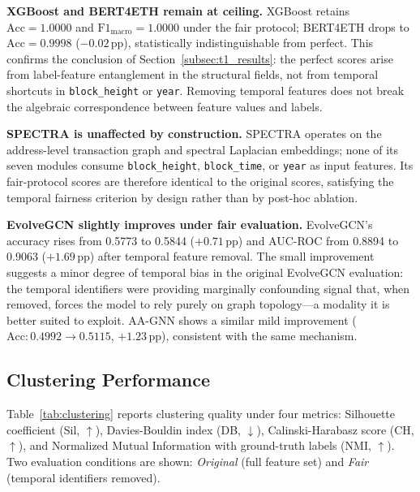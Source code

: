 \documentclass[journal]{IEEEtran}
\begin{document}
\textbf{XGBoost and BERT4ETH remain at ceiling.}
XGBoost retains $\text{Acc} = \num{1.0000}$ and $\text{F1}_{\text{macro}} = \num{1.0000}$
under the fair protocol; BERT4ETH drops to $\text{Acc} = \num{0.9998}$
($-\num{0.02}$\,pp), statistically indistinguishable from perfect.
This confirms the conclusion of Section~\ref{subsec:t1_results}: the
perfect scores arise from label-feature entanglement in the structural
fields, not from temporal shortcuts in \texttt{block\_height} or
\texttt{year}.
Removing temporal features does not break the algebraic correspondence
between feature values and labels.

\textbf{SPECTRA is unaffected by construction.}
SPECTRA operates on the address-level transaction graph and spectral
Laplacian embeddings; none of its seven modules consume \texttt{block\_height},
\texttt{block\_time}, or \texttt{year} as input features.
Its fair-protocol scores are therefore identical to the original scores,
satisfying the temporal fairness criterion by design rather than by
post-hoc ablation.

\textbf{EvolveGCN slightly improves under fair evaluation.}
EvolveGCN's accuracy rises from \num{0.5773} to \num{0.5844}
($+\num{0.71}$\,pp) and AUC-ROC from \num{0.8894} to \num{0.9063}
($+\num{1.69}$\,pp) after temporal feature removal.
The small improvement suggests a minor degree of temporal bias in the
original EvolveGCN evaluation: the temporal identifiers were providing
marginally confounding signal that, when removed, forces the model to
rely purely on graph topology---a modality it is better suited to exploit.
AA-GNN shows a similar mild improvement ($\text{Acc}: \num{0.4992} \to
\num{0.5115}$, $+\num{1.23}$\,pp), consistent with the same mechanism.


\subsection{Clustering Performance}
\label{subsec:clustering_results}

Table~\ref{tab:clustering} reports clustering quality under four metrics:
Silhouette coefficient (Sil, $\uparrow$), Davies-Bouldin index
(DB, $\downarrow$), Calinski-Harabasz score (CH, $\uparrow$), and
Normalized Mutual Information with ground-truth labels (NMI, $\uparrow$).
Two evaluation conditions are shown: \emph{Original} (full feature set)
and \emph{Fair} (temporal identifiers removed).
\end{document}
